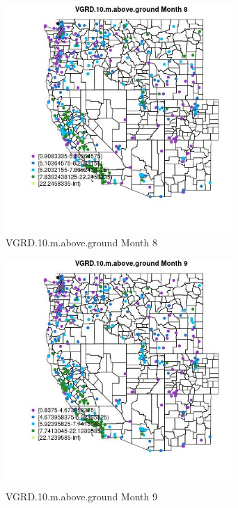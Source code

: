 \begin{figure} 
\centering  
\includegraphics[width=0.77\textwidth]{Code_Outputs/ML_input_report_ML_input_PM25_Step5_part_d_de_duplicated_aves_ML_input_MapObsMo8VGRD10maboveground.jpg} 
\caption{\label{fig:ML_input_report_ML_input_PM25_Step5_part_d_de_duplicated_aves_ML_inputMapObsMo8VGRD10maboveground}VGRD.10.m.above.ground Month 8} 
\end{figure} 
 

\begin{figure} 
\centering  
\includegraphics[width=0.77\textwidth]{Code_Outputs/ML_input_report_ML_input_PM25_Step5_part_d_de_duplicated_aves_ML_input_MapObsMo9VGRD10maboveground.jpg} 
\caption{\label{fig:ML_input_report_ML_input_PM25_Step5_part_d_de_duplicated_aves_ML_inputMapObsMo9VGRD10maboveground}VGRD.10.m.above.ground Month 9} 
\end{figure} 
 

